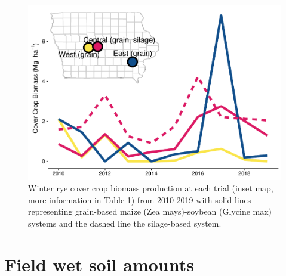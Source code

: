 \documentclass[]{article}
\begin{document}
\begin{figure}
\centering
\includegraphics{supp-mat_files/figure-latex/unnamed-chunk-1-1.pdf}
\caption{Winter rye cover crop biomass production at each trial (inset
map, more information in Table 1) from 2010-2019 with solid lines
representing grain-based maize (Zea mays)-soybean (Glycine max) systems
and the dashed line the silage-based system.}
\end{figure}

\newpage

\hypertarget{field-wet-soil-amounts}{%
\section{Field wet soil amounts}\label{field-wet-soil-amounts}}
\end{document}
